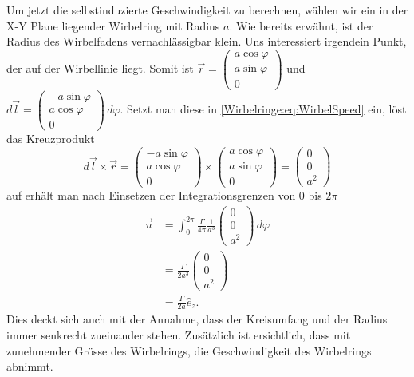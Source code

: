 Um jetzt die selbstinduzierte Geschwindigkeit zu berechnen, wählen wir ein in der X-Y Plane liegender Wirbelring mit Radius \(a\).
Wie bereits erwähnt, ist der Radius des Wirbelfadens vernachlässigbar klein.
Uns interessiert irgendein Punkt, der auf der Wirbellinie liegt.
Somit ist
\(
\vec{r} = 
\begin{pmatrix}
    a \cos \varphi\\
    a \sin \varphi\\
    0    
\end{pmatrix}\)
und
\(
d\vec{l} = 
\begin{pmatrix}
    -a \sin \varphi\\
    a \cos \varphi\\
    0    
\end{pmatrix}
\,d\varphi \). 
Setzt man diese in \eqref{Wirbelringe:eq:WirbelSpeed} ein, löst das Kreuzprodukt 
\[
d\vec{l}\times\vec{r} 
= 
\begin{pmatrix}
    -a \sin \varphi\\
    a \cos \varphi\\
    0
\end{pmatrix}
\times
\begin{pmatrix}
    a \cos \varphi\\
    a \sin \varphi\\
    0    
\end{pmatrix}
=
\begin{pmatrix}
    0\\
    0\\
    a^2
\end{pmatrix}
\]
auf erhält man nach Einsetzen der Integrationsgrenzen von 0 bis \(2\pi\)
\begin{align*}
\vec{u}
&=
\int_{0}^{2\pi} \frac{\Gamma}{4\pi}\frac{1}{a^3}
\begin{pmatrix}
    0\\
    0\\
    a^2
\end{pmatrix}
\,d\varphi\\
&=\frac{\Gamma}{2a^3}
\begin{pmatrix}
    0\\
    0\\
    a^2
\end{pmatrix}\\
&=\frac{\Gamma}{2a}\hat{e}_z.
\end{align*}    
Dies deckt sich auch mit der Annahme, dass der Kreisumfang und der Radius immer senkrecht zueinander stehen.
Zusätzlich ist ersichtlich, dass mit zunehmender Grösse des Wirbelrings, die Geschwindigkeit des Wirbelrings abnimmt.

